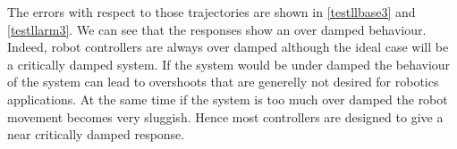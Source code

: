 	The errors with respect to those trajectories are shown in \ref{testllbase3} and \ref{testllarm3}. We can see that the responses show an over damped behaviour. Indeed, robot controllers are always over damped although the ideal case will be a critically damped system.  If the system would be under damped the behaviour of the system can lead to overshoots that are generelly not desired for robotics applications. At the same time if the system is too much over damped the robot movement becomes very sluggish. Hence most controllers are designed to give a near critically damped response.